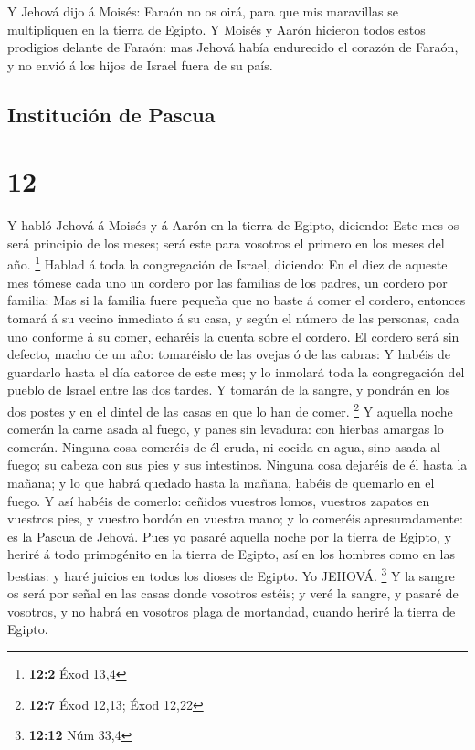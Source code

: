  Y Jehová dijo á Moisés: Faraón no os oirá, para que mis
maravillas se multipliquen en la tierra de Egipto.  Y
Moisés y Aarón hicieron todos estos prodigios delante de Faraón: mas
Jehová había endurecido el corazón de Faraón, y no envió á los hijos de
Israel fuera de su país.

\hypertarget{instituciuxf3n-de-pascua}{%
\subsection{Institución de Pascua}\label{instituciuxf3n-de-pascua}}

\hypertarget{section-11}{%
\section{12}\label{section-11}}

 Y habló Jehová á Moisés y á Aarón en la tierra de Egipto,
diciendo:  Este mes os será principio de los meses; será
este para vosotros el primero en los meses del año. \footnote{\textbf{12:2}
  Éxod 13,4}  Hablad á toda la congregación de Israel,
diciendo: En el diez de aqueste mes tómese cada uno un cordero por las
familias de los padres, un cordero por familia:  Mas si la
familia fuere pequeña que no baste á comer el cordero, entonces tomará á
su vecino inmediato á su casa, y según el número de las personas, cada
uno conforme á su comer, echaréis la cuenta sobre el cordero.
 El cordero será sin defecto, macho de un año: tomaréislo
de las ovejas ó de las cabras:  Y habéis de guardarlo
hasta el día catorce de este mes; y lo inmolará toda la congregación del
pueblo de Israel entre las dos tardes.  Y tomarán de la
sangre, y pondrán en los dos postes y en el dintel de las casas en que
lo han de comer. \footnote{\textbf{12:7} Éxod 12,13; Éxod 12,22}
 Y aquella noche comerán la carne asada al fuego, y panes
sin levadura: con hierbas amargas lo comerán.  Ninguna
cosa comeréis de él cruda, ni cocida en agua, sino asada al fuego; su
cabeza con sus pies y sus intestinos.  Ninguna cosa
dejaréis de él hasta la mañana; y lo que habrá quedado hasta la mañana,
habéis de quemarlo en el fuego.  Y así habéis de comerlo:
ceñidos vuestros lomos, vuestros zapatos en vuestros pies, y vuestro
bordón en vuestra mano; y lo comeréis apresuradamente: es la Pascua de
Jehová.  Pues yo pasaré aquella noche por la tierra de
Egipto, y heriré á todo primogénito en la tierra de Egipto, así en los
hombres como en las bestias: y haré juicios en todos los dioses de
Egipto. Yo JEHOVÁ. \footnote{\textbf{12:12} Núm 33,4}  Y
la sangre os será por señal en las casas donde vosotros estéis; y veré
la sangre, y pasaré de vosotros, y no habrá en vosotros plaga de
mortandad, cuando heriré la tierra de Egipto.

